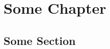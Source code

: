 \documentclass[11pt, book]{memoir}
\theoremstyle{plain}
\theoremstyle{plain}
\theoremstyle{remark}
\newcommand{\?}{{\color{gray}{?}}}
\begin{document}
   

\tableofcontents

  



\chapter{Some Chapter}
\section{Some Section}
\end{document}
